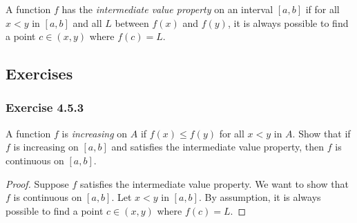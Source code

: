 \begin{tcolorbox}
\begin{defn}
    A function \( f  \) has the \textit{intermediate value property} on an interval \( [a,b] \) if for all \( x < y  \) in \( [a,b] \) and all \( L   \) between \( f(x)  \) and \( f(y) \), it is always possible to find a point \( c \in (x,y) \) where \( f(c) = L  \).
\end{defn}
\end{tcolorbox}

\subsection{Exercises}

\subsubsection{Exercise 4.5.3} A function \( f  \) is \textit{increasing} on \( A  \) if \( f(x) \leq f(y) \) for all \( x < y  \) in \( A  \). Show that if \( f  \) is increasing on \( [a,b] \) and satisfies the intermediate value property, then \( f  \) is continuous on \( [a,b] \). 
\begin{proof}
    Suppose \( f  \) satisfies the intermediate value property. We want to show that \( f  \) is continuous on \( [a,b] \). Let \( x < y  \) in \( [a,b] \). By assumption, it is always possible to find a point \( c \in (x,y)  \) where \( f(c) = L  \).
\end{proof}


